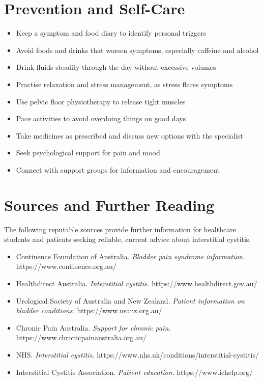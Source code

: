 \section*{Prevention and Self-Care}
\begin{itemize}
    \item Keep a symptom and food diary to identify personal triggers
    \item Avoid foods and drinks that worsen symptoms, especially caffeine and alcohol
    \item Drink fluids steadily through the day without excessive volumes
    \item Practise relaxation and stress management, as stress flares symptoms
    \item Use pelvic floor physiotherapy to release tight muscles
    \item Pace activities to avoid overdoing things on good days
    \item Take medicines as prescribed and discuss new options with the specialist
    \item Seek psychological support for pain and mood
    \item Connect with support groups for information and encouragement
\end{itemize}

\section*{Sources and Further Reading}
The following reputable sources provide further information for healthcare students and patients seeking reliable, current advice about interstitial cystitis.
\begin{itemize}
    \item Continence Foundation of Australia. \textit{Bladder pain syndrome information.} https://www.continence.org.au/
    \item Healthdirect Australia. \textit{Interstitial cystitis.} https://www.healthdirect.gov.au/
    \item Urological Society of Australia and New Zealand. \textit{Patient information on bladder conditions.} https://www.usanz.org.au/
    \item Chronic Pain Australia. \textit{Support for chronic pain.} https://www.chronicpainaustralia.org.au/
    \item NHS. \textit{Interstitial cystitis.} https://www.nhs.uk/conditions/interstitial-cystitis/
    \item Interstitial Cystitis Association. \textit{Patient education.} https://www.ichelp.org/
\end{itemize}
